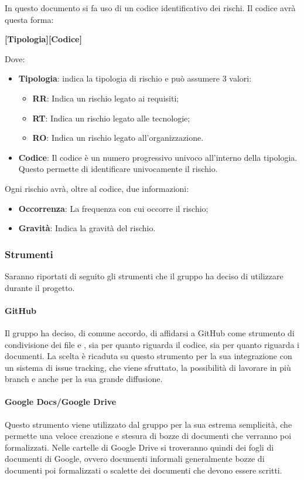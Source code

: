 \documentclass[../norme_di_progetto.tex]{subfiles}
\begin{document}
In questo documento si fa uso di un codice identificativo dei rischi. Il codice avrà questa forma:
\begin{center}
	\textbf{[Tipologia][Codice]}
\end{center}
Dove:
\begin{itemize}

	\item \textbf{Tipologia}: indica la tipologia di rischio e può assumere 3 valori:
	\begin{itemize}
		\item \textbf{RR}: Indica un rischio legato ai requisiti;
		\item \textbf{RT}: Indica un rischio legato alle tecnologie;
		\item \textbf{RO}: Indica un rischio legato all'organizzazione.
	\end{itemize}
	\item \textbf{Codice}: Il codice è un numero progressivo univoco all'interno della tipologia. Questo permette di identificare univocamente il rischio.
\end{itemize}

Ogni rischio avrà, oltre al codice, due informazioni: 
\begin{itemize}
	\item \textbf{Occorrenza}: La frequenza con cui occorre il rischio;
	\item \textbf{Gravità}: Indica la gravità del rischio.
\end{itemize}


\subsubsection{Strumenti}
Saranno riportati di seguito gli strumenti che il gruppo ha deciso di utilizzare durante il progetto.

\paragraph{GitHub}
Il gruppo ha deciso, di comune accordo, di affidarsi a GitHub come strumento di condivisione dei file e , sia per quanto riguarda il codice, sia per quanto riguarda i documenti. La scelta è ricaduta su questo strumento per la sua integrazione con un sistema di issue tracking, che viene sfruttato, la possibilità di lavorare in più branch e anche per la sua grande diffusione.

\paragraph{Google Docs/Google Drive}
Questo strumento viene utilizzato dal gruppo per la sua estrema semplicità, che permette una veloce creazione e stesura di bozze di documenti che verranno poi formalizzati. Nelle cartelle di Google Drive si troveranno quindi dei fogli di documenti di Google, ovvero documenti informali generalmente bozze di documenti poi formalizzati o scalette dei documenti che devono essere scritti.
\end{document}
